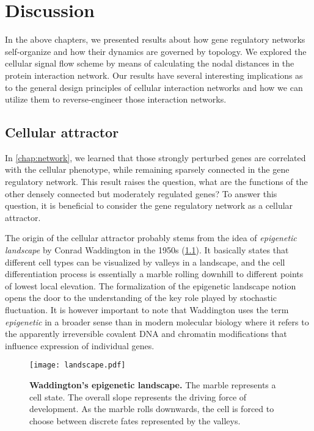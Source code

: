 \chapter{Discussion}
In the above chapters, we presented results about how gene regulatory networks
self-organize and how their dynamics are governed by topology. We explored
the cellular signal flow scheme by means of calculating the nodal distances in
the protein interaction network. Our results have several interesting implications
as to the general design principles of cellular interaction networks and
how we can utilize them to reverse-engineer those interaction networks.

\section{Cellular attractor}
In \ref{chap:network}, we learned that those strongly perturbed genes are
correlated with the cellular phenotype, while remaining sparsely connected in
the gene regulatory network. This result raises the question, what are the
functions of the other densely connected but moderately regulated genes? 
To answer this question, it is beneficial to consider the gene regulatory network
as a cellular attractor.

The origin of the cellular attractor probably stems from the idea of 
\emph{epigenetic landscape} by Conrad Waddington in the 1950s 
(\ref{fig:landscape}). It basically
states that different cell types can be visualized by valleys in a landscape,
and the cell differentiation process is essentially a marble rolling downhill to
different points of lowest local elevation. The formalization of the epigenetic landscape notion opens the door to the understanding of the key role played by stochastic fluctuation. 
It is however important to note that Waddington uses the term \emph{epigenetic} in a broader sense than in modern molecular biology where it refers to the apparently irreversible covalent DNA and chromatin modifications that influence expression of individual genes.

\begin{figure}[!ht]
\begin{center}
\texttt{[image: landscape.pdf]}
\end{center}
\caption[Waddington's epigenetic landscape]{
{\bf Waddington's epigenetic landscape.}
The marble represents a cell state. The overall slope represents the driving force of development. As the marble rolls downwards, the cell is forced to choose between discrete fates represented by the valleys.
}
\label{fig:landscape}
\end{figure}


